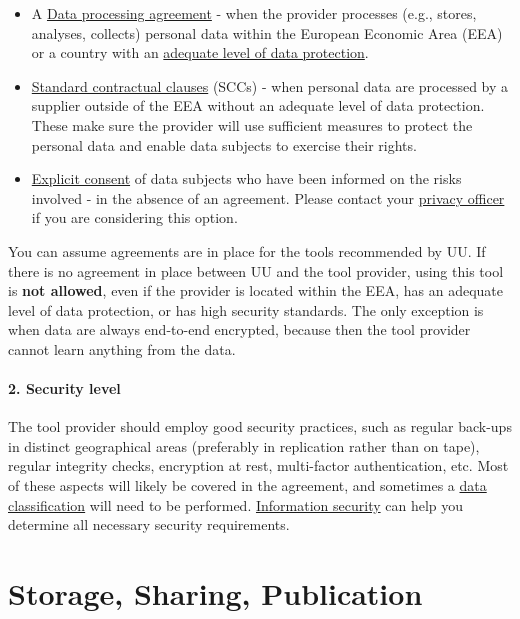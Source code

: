 \documentclass[
]{book}
\providecommand{\tightlist}{%
  \setlength{\itemsep}{0pt}\setlength{\parskip}{0pt}}
\begin{document}
\begin{itemize}
\tightlist
\item
  A \protect\hyperlink{data-processing-agreement}{Data processing agreement} -
  when the provider processes (e.g., stores, analyses, collects) personal data
  within the European Economic Area (EEA) or a country with an
  \href{https://ec.europa.eu/info/law/law-topic/data-protection/international-dimension-data-protection/adequacy-decisions_en}{adequate level of data protection}.
\item
  \protect\hyperlink{scc}{Standard contractual clauses} (SCCs) - when personal data are processed
  by a supplier outside of the EEA without an adequate level of data protection.
  These make sure the provider will use sufficient measures to protect the personal
  data and enable data subjects to exercise their rights.
\item
  \protect\hyperlink{informed-consent-forms}{Explicit consent} of data subjects who have been
  informed on the risks involved - in the absence of an agreement. Please contact your
  \protect\hyperlink{support}{privacy officer} if you are considering this option.
\end{itemize}

You can assume agreements are in place for the tools recommended by UU.
If there is no agreement in place between UU and the tool provider, using
this tool is \textbf{not allowed}, even if the provider is located within the EEA,
has an adequate level of data protection, or has high security standards. The
only exception is when data are always end-to-end encrypted, because then the
tool provider cannot learn anything from the data.

\hypertarget{security-level}{%
\subsection{2. Security level}\label{security-level}}

The tool provider should employ good security practices, such as regular back-ups
in distinct geographical areas (preferably in replication rather than on tape),
regular integrity checks, encryption at rest, multi-factor authentication, etc.
Most of these aspects will likely be covered in the agreement, and sometimes a
\protect\hyperlink{data-classification}{data classification} will need to be performed.
\protect\hyperlink{support}{Information security} can help you determine all necessary security requirements.

\hypertarget{part-storage-sharing-publication}{%
\part*{Storage, Sharing, Publication}\label{part-storage-sharing-publication}}
\end{document}
